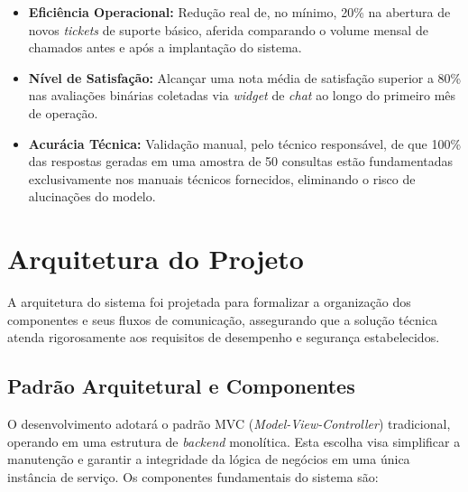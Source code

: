 \documentclass[a4paper,12pt,Times]{article}
\begin{document}
\begin{itemize}
    \item \textbf{Eficiência Operacional:} Redução real de, no mínimo, 20\% na abertura de
          novos \textit{tickets} de suporte básico, aferida comparando o volume mensal de
          chamados antes e após a implantação do sistema.
    \item \textbf{Nível de Satisfação:} Alcançar uma nota média de satisfação superior a
          80\% nas avaliações binárias coletadas via \textit{widget} de \textit{chat} ao
          longo do primeiro mês de operação.
    \item \textbf{Acurácia Técnica:} Validação manual, pelo técnico responsável, de que
          100\% das respostas geradas em uma amostra de 50 consultas estão fundamentadas
          exclusivamente nos manuais técnicos fornecidos, eliminando o risco de alucinações
          do modelo.
\end{itemize}


\section{Arquitetura do Projeto}

A arquitetura do sistema foi projetada para formalizar a organização dos componentes e
seus fluxos de comunicação, assegurando que a solução técnica atenda rigorosamente aos
requisitos de desempenho e segurança estabelecidos.

\subsection{Padrão Arquitetural e Componentes}

O desenvolvimento adotará o padrão MVC (\textit{Model-View-Controller}) tradicional,
operando em uma estrutura de \textit{backend} monolítica. Esta escolha visa simplificar a
manutenção e garantir a integridade da lógica de negócios em uma única instância de
serviço. Os componentes fundamentais do sistema são:
\end{document}

